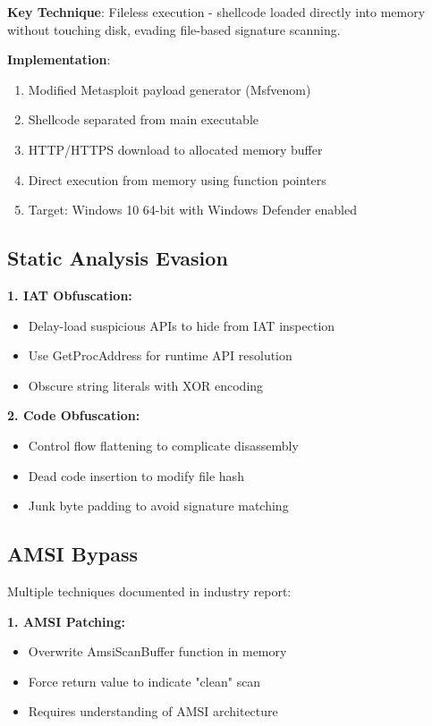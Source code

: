 \documentclass[11pt,conference]{IEEEtran}
\begin{document}
\textbf{Key Technique}: Fileless execution - shellcode loaded directly into memory without touching disk, evading file-based signature scanning.

\textbf{Implementation}:
\begin{enumerate}
    \item Modified Metasploit payload generator (Msfvenom)
    \item Shellcode separated from main executable
    \item HTTP/HTTPS download to allocated memory buffer
    \item Direct execution from memory using function pointers
    \item Target: Windows 10 64-bit with Windows Defender enabled
\end{enumerate}

\subsection{Static Analysis Evasion}

\textbf{1. IAT Obfuscation:}
\begin{itemize}
    \item Delay-load suspicious APIs to hide from IAT inspection
    \item Use GetProcAddress for runtime API resolution
    \item Obscure string literals with XOR encoding
\end{itemize}

\textbf{2. Code Obfuscation:}
\begin{itemize}
    \item Control flow flattening to complicate disassembly
    \item Dead code insertion to modify file hash
    \item Junk byte padding to avoid signature matching
\end{itemize}

\subsection{AMSI Bypass}

Multiple techniques documented in industry report:

\textbf{1. AMSI Patching:}
\begin{itemize}
    \item Overwrite AmsiScanBuffer function in memory
    \item Force return value to indicate "clean" scan
    \item Requires understanding of AMSI architecture
\end{itemize}
\end{document}

